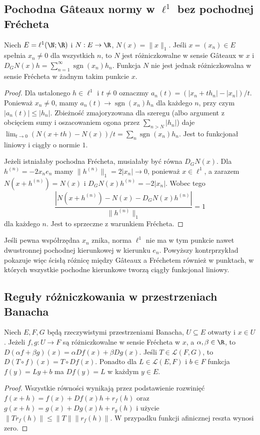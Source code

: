 \subsection{Pochodna Gâteaux normy w \texorpdfstring{$\ell^1$}{ell1} bez pochodnej Frécheta}

\begin{twierdzenie}
\label{thm:l1-gateaux14}
Niech $E=\ell^1(\N;\R)$ i $N:E\to\R$, $N(x)=\|x\|_1$. Jeśli $x=(x_n)\in E$ spełnia $x_n\ne0$ dla wszystkich $n$, to $N$ jest różniczkowalne w sensie Gâteaux w $x$ i
$D_GN(x)h=\sum_{n=1}^\infty \operatorname{sgn}(x_n)h_n$.
Funkcja $N$ nie jest jednak różniczkowalna w sensie Frécheta w żadnym takim punkcie $x$.
\end{twierdzenie}
\begin{proof}
Dla ustalonego $h\in\ell^1$ i $t\ne0$ oznaczmy $a_n(t)=(|x_n+th_n|-|x_n|)/t$. Ponieważ $x_n\ne0$, mamy $a_n(t)\to\operatorname{sgn}(x_n)h_n$ dla każdego $n$, przy czym $|a_n(t)|\le|h_n|$. Zbieżność zmajoryzowana dla szeregu (albo argument z obcięciem sumy i oszacowaniem ogona przez $\sum_{n>N}|h_n|$) daje
$\lim_{t\to0}(N(x+th)-N(x))/t=\sum_n \operatorname{sgn}(x_n)h_n$.
Jest to funkcjonał liniowy i ciągły o normie $1$.

Jeżeli istniałaby pochodna Frécheta, musiałaby być równa $D_GN(x)$. Dla $h^{(n)}=-2x_ne_n$ mamy $\|h^{(n)}\|_1=2|x_n|\to0$, ponieważ $x\in\ell^1$, a zarazem $N(x+h^{(n)})=N(x)$ i $D_GN(x)h^{(n)}=-2|x_n|$. Wobec tego
\[
\frac{|N(x+h^{(n)})-N(x)-D_GN(x)h^{(n)}|}{\|h^{(n)}\|_1}=1
\]
dla każdego $n$. Jest to sprzeczne z warunkiem Frécheta.
\end{proof}

\begin{uwaga}
Jeśli pewna współrzędna $x_n$ znika, norma $\ell^1$ nie ma w tym punkcie nawet dwustronnej pochodnej kierunkowej w kierunku $e_n$. Powyższy kontrprzykład pokazuje więc ścisłą różnicę między Gâteaux a Fréchetem również w punktach, w których wszystkie pochodne kierunkowe tworzą ciągły funkcjonał liniowy.
\end{uwaga}

\subsection{Reguły różniczkowania w przestrzeniach Banacha}

\begin{stwierdzenie}
\label{prop:sum-linear14}
Niech $E,F,G$ będą rzeczywistymi przestrzeniami Banacha, $U\subseteq E$ otwarty i $x\in U$. Jeżeli $f,g:U\to F$ są różniczkowalne w sensie Frécheta w $x$, a $\alpha,\beta\in\R$, to $D(\alpha f+\beta g)(x)=\alpha Df(x)+\beta Dg(x)$. Jeśli $T\in\mathcal L(F,G)$, to $D(T\circ f)(x)=T\circ Df(x)$. Ponadto dla $L\in\mathcal L(E,F)$ i $b\in F$ funkcja $f(y)=Ly+b$ ma $Df(y)=L$ w każdym $y\in E$.
\end{stwierdzenie}
\begin{proof}
Wszystkie równości wynikają przez podstawienie rozwinięć $f(x+h)=f(x)+Df(x)h+r_f(h)$ oraz $g(x+h)=g(x)+Dg(x)h+r_g(h)$ i użycie $\|Tr_f(h)\|\le\|T\|\|r_f(h)\|$. W przypadku funkcji afinicznej reszta wynosi zero.
\end{proof}

